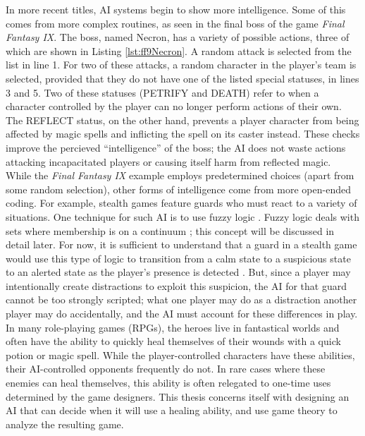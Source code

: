 In more recent titles, AI systems begin to show more intelligence. Some of this comes from more complex routines, as seen in the final boss of the game \textit{Final Fantasy IX}. The boss, named Necron, has a variety of possible actions, three of which are shown in Listing \ref{lst:ff9Necron}. A random attack is selected from the list in line 1. For two of these attacks, a random character in the player's team is selected, provided that they do not have one of the listed special statuses, in lines 3 and 5. Two of these statuses (PETRIFY and DEATH) refer to when a character controlled by the player can no longer perform actions of their own. The REFLECT status, on the other hand, prevents a player character from being affected by magic spells and inflicting the spell on its caster instead. These checks improve the percieved ``intelligence'' of the boss; the AI does not waste actions attacking incapacitated players or causing itself harm from reflected magic.\\

While the \textit{Final Fantasy IX} example employs predetermined choices (apart from some random selection), other forms of intelligence come from more open-ended coding. For example, stealth games feature guards who must react to a variety of situations. One technique for such AI is to use fuzzy logic \cite{schw04}. Fuzzy logic deals with sets where membership is on a continuum \cite{zade65}; this concept will be discussed in detail later. For now, it is sufficient to understand that a guard in a stealth game would use this type of logic to transition from a calm state to a suspicious state to an alerted state as the player's presence is detected \cite{schw04}. But, since a player may intentionally create distractions to exploit this suspicion, the AI for that guard cannot be too strongly scripted; what one player may do as a distraction another player may do accidentally, and the AI must account for these differences in play.\\

In many role-playing games (RPGs), the heroes live in fantastical worlds and often have the ability to quickly heal themselves of their wounds with a quick potion or magic spell. While the player-controlled characters have these abilities, their AI-controlled opponents frequently do not. In rare cases where these enemies can heal themselves, this ability is often relegated to one-time uses determined by the game designers. This thesis concerns itself with designing an AI that can decide when it will use a healing ability, and use game theory to analyze the resulting game.